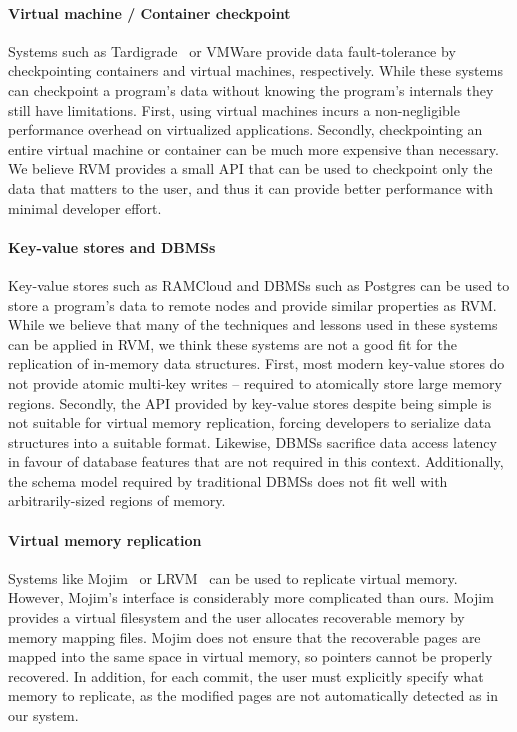 \paragraph {\bf Virtual machine / Container checkpoint} Systems such as
Tardigrade~\cite{Tardigrade} or VMWare provide data fault-tolerance by
checkpointing containers and virtual machines, respectively.  While these
systems can checkpoint a program's data without knowing the program's internals
they still have limitations.  First, using virtual machines incurs a
non-negligible performance overhead on virtualized applications. Secondly,
checkpointing an entire virtual machine or container can be much more expensive
than necessary.  We believe RVM provides a small API that can be used to
checkpoint only the data that matters to the user, and thus it can provide
better performance with minimal developer effort.

\paragraph {\bf Key-value stores and DBMSs} Key-value stores such as RAMCloud
and DBMSs such as Postgres can be used to store a program's data to remote
nodes and provide similar properties as RVM. While we believe that many of the
techniques and lessons used in these systems can be applied in RVM, we think
these systems are not a good fit for the replication of in-memory data
structures.  First, most modern key-value stores do not provide atomic
multi-key writes -- required to atomically store large memory regions.
Secondly, the API provided by key-value stores despite being simple is not
suitable for virtual memory replication, forcing developers to serialize data
structures into a suitable format.  Likewise, DBMSs sacrifice data access
latency in favour of database features that are not required in this context.
Additionally, the schema model required by traditional DBMSs does not fit well
with arbitrarily-sized regions of memory.

\paragraph {\bf Virtual memory replication} Systems like Mojim~\cite{Mojim} or
LRVM~\cite{LRVM} can be used to replicate virtual memory. However, Mojim's interface
is considerably more complicated than ours. Mojim provides a virtual filesystem
and the user allocates recoverable memory by memory mapping files. Mojim does
not ensure that the recoverable pages are mapped into the same space in virtual
memory, so pointers cannot be properly recovered. In addition, for each commit,
the user must explicitly specify what memory to replicate, as the modified
pages are not automatically detected as in our system.
